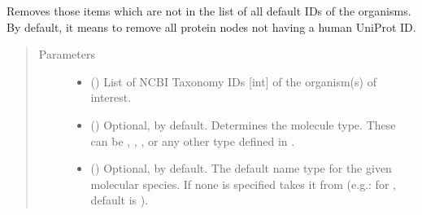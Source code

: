 \documentclass[letterpaper,10pt,english]{sphinxmanual}
\begin{document}
\begin{fulllineitems}
\begin{fulllineitems}
\end{fulllineitems}


\begin{fulllineitems}
\label{\detokenize{main:pypath.main.PyPath.delete_unknown}}
Removes those items which are not in the list of all default
IDs of the organisms. By default, it means to remove all protein
nodes not having a human UniProt ID.
\begin{quote}\begin{description}
\item[{Parameters}] \leavevmode\begin{itemize}
\item {} 
 () \textendash{} List of NCBI Taxonomy IDs {[}int{]} of the organism(s) of
interest.

\item {} 
 () \textendash{} Optional,  by default. Determines the molecule
type. These can be , , ,
 or any other type defined in
.

\item {} 
 () \textendash{} Optional,  by default. The default name type for the
given molecular species. If none is specified takes it from
 (e.g.: for
, default is ).

\end{itemize}

\end{description}\end{quote}

\end{fulllineitems}



\end{fulllineitems}
\end{document}
